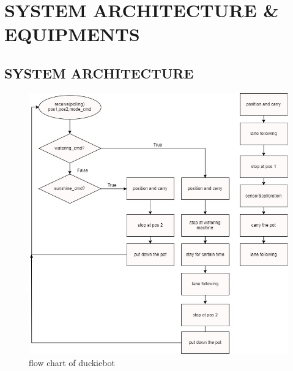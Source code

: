 \documentclass[a4paper, 10pt, conference]{ieeeconf}      %
\begin{document}
\section{SYSTEM ARCHITECTURE \& EQUIPMENTS}



\subsection{SYSTEM ARCHITECTURE}


\begin{figure}[htbp] %
\includegraphics[width=0.8\columnwidth]{car_flowchart.jpg}
\centering
\caption{flow chart of duckiebot}
\end{figure}
\end{document}
